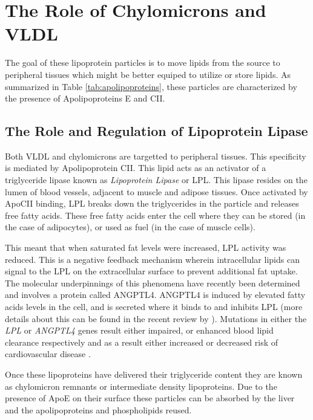 \documentclass{tufte-handout}
\begin{document}
\section{The Role of Chylomicrons and VLDL}

The goal of these lipoprotein particles is to move lipids from the source to peripheral tissues which might be better equiped to utilize or store lipids.  As summarized in Table \ref{tab:apolipoproteins}, these particles are characterized by the presence of Apolipoproteins E and CII.

\subsection{The Role and Regulation of Lipoprotein Lipase}

Both VLDL and chylomicrons are targetted to peripheral tissues.  This specificity is mediated by Apolipoprotein CII.  This lipid acts as an activator of a triglyceride lipase known as \emph{Lipoprotein Lipase} or LPL.  This lipase resides on the lumen of blood vessels, adjacent to muscle and adipose tissues.  Once activated by ApoCII binding, LPL breaks down the triglycerides in the particle and releases free fatty acids.  These free fatty acids enter the cell where they can be stored (in the case of adipocytes), or used as fuel (in the case of muscle cells).

  This meant that when saturated fat levels were increased, LPL activity was reduced.  This is a negative feedback mechanism wherein intracellular lipids can signal to the LPL on the extracellular surface to prevent additional fat uptake.  The molecular underpinnings of this phenomena have recently been determined and involves a protein called ANGPTL4.  ANGPTL4 is induced by elevated fatty acids levels in the cell, and is secreted where it binds to and inhibits LPL (more details about this can be found in the recent review by \citet{Dijk2014}).  Mutations in either the \textit{LPL} or \textit{ANGPTL4} genes result either impaired, or enhanced blood lipid clearance respectively and as a result either increased or decreased risk of cardiovascular disease \citep{Article2016b}.

  Once these lipoproteins have delivered their triglyceride content they are known as chylomicron remnants or intermediate density lipoproteins.  Due to the presence of ApoE on their surface these particles can be absorbed by the liver and the apolipoproteins and phospholipids reused.
\end{document}
